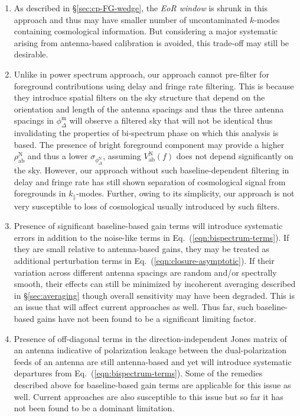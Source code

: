 \documentclass[
reprint,
superscriptaddress,
amsmath,
amssymb,
aps,
prd
]{revtex4-1}
\begin{document}
\begin{enumerate}
\item As described in \S\ref{sec:cp-FG-wedge}, the {\it EoR window} is shrunk in this approach and thus may have smaller number of uncontaminated $k$-modes containing cosmological information. But considering a major systematic arising from antenna-based calibration is avoided, this trade-off may still be desirable.
\item Unlike in power spectrum approach, our approach cannot pre-filter for foreground contributions using delay and fringe rate filtering. This is because they introduce spatial filters on the sky structure that depend on the orientation and length of the antenna spacings and thus the three antenna spacings in $\phi_\Delta^\textrm{m}$ will observe a filtered sky that will not be identical thus invalidating the properties of bi-spectrum phase on which this analysis is based. The presence of bright foreground component may provide a higher $\rho_\textrm{ab}^\textrm{N}$ and thus a lower $\sigma_{\phi_\Delta^\textrm{N}}$, assuming $V_\textrm{ab}^\textrm{N}(f)$ does not depend significantly on the sky. However, our approach without such baseline-dependent filtering in delay and fringe rate has still shown separation of cosmological signal from foregrounds in $k_\parallel$-modes. Further, owing to its simplicity, our approach is not very susceptible to loss of cosmological usually introduced by such filters.
\item Presence of significant baseline-based gain terms will introduce systematic errors in addition to the noise-like terms in Eq.~(\ref{eqn:bispectrum-terms}). If they are small relative to antenna-based gains, they may be treated as additional perturbation terms in Eq.~(\ref{eqn:closure-asymptotic}). If their variation across different antenna spacings are random and/or spectrally smooth, their effects can still be minimized by incoherent averaging described in \S\ref{sec:averaging} though overall sensitivity may have been degraded. This is an issue that will affect current approaches as well. Thus far, such baseline-based gains have not been found to be a significant limiting factor. 
\item Presence of off-diagonal terms in the direction-independent Jones matrix of an antenna indicative of polarization leakage between the dual-polarization feeds of an antenna are still antenna-based and yet will introduce systematic departures from Eq.~(\ref{eqn:bispectrum-terms}). Some of the remedies described above for baseline-based gain terms are applicable for this issue as well. Current approaches are also susceptible to this issue but so far it has not been found to be a dominant limitation.

\end{enumerate}
\end{document}
